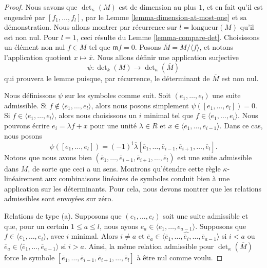 \begin{proof}
Nous savons que $\det_\kappa(M)$ est de dimension au plus $1$, et en fait qu'il
est engendré par $[f_1, \ldots, f_l]$, par le
Lemme \ref{lemma-dimension-at-most-one} et sa démonstration.
Nous allons montrer par récurrence sur $l = \text{longueur}(M)$
qu'il est non nul. Pour $l = 1$, ceci résulte du Lemme \ref{lemma-compare-det}.
Choisissons un élément non nul $f \in M$
tel que $\mathfrak m f = 0$. Posons $\overline{M} = M /\langle f \rangle$,
et notons l'application quotient $x \mapsto \overline{x}$.
Nous allons définir une application surjective
$$
\psi : \det\nolimits_k(M) \to \det\nolimits_\kappa(\overline{M})
$$
qui prouvera le lemme puisque, par récurrence, le déterminant de
$\overline{M}$ est non nul.

\medskip\noindent
Nous définissons $\psi$ sur les symboles comme suit.
Soit $(e_1, \ldots, e_l)$ une suite admissible.
Si $f \not \in \langle e_1, \ldots, e_l \rangle$, alors
nous posons simplement $\psi([e_1, \ldots, e_l]) = 0$.
Si $f \in \langle e_1, \ldots, e_l \rangle$, alors nous choisissons
un $i$ minimal tel que $f \in \langle e_1, \ldots, e_i \rangle$.
Nous pouvons écrire $e_i = \lambda f + x$ pour une unité $\lambda \in R$
et $x \in \langle e_1, \ldots, e_{i - 1} \rangle$.
Dans ce cas, nous posons
$$
\psi([e_1, \ldots, e_l]) =
(-1)^i
\overline{\lambda}[\overline{e}_1, \ldots,
\overline{e}_{i - 1},
\overline{e}_{i + 1}, \ldots, \overline{e}_l].
$$
Notons que nous avons bien
$(\overline{e}_1, \ldots,
\overline{e}_{i - 1},
\overline{e}_{i + 1}, \ldots, \overline{e}_l)$
est une suite admissible dans $\overline{M}$, de sorte que ceci a un sens.
Montrons qu'étendre cette règle $\kappa$-linéairement aux
combinaisons linéaires de symboles conduit bien à une application sur les
déterminants. Pour cela, nous devons montrer que les relations
admissibles sont envoyées sur zéro.

\medskip\noindent
Relations de type (a). Supposons que $(e_1, \ldots, e_l)$ soit une
suite admissible et que, pour un certain $1 \leq a \leq l$, nous ayons
$e_a \in \langle e_1, \ldots, e_{a - 1}\rangle$.
Supposons que $f \in \langle e_1, \ldots, e_i\rangle$, avec $i$ minimal.
Alors $i \not = a$ et
$\overline{e}_a \in \langle \overline{e}_1, \ldots,
\hat{\overline{e}_i}, \ldots, \overline{e}_{a - 1}\rangle$ si $i < a$
ou
$\overline{e}_a \in \langle \overline{e}_1, \ldots,
\overline{e}_{a - 1}\rangle$ si $i > a$.
Ainsi, la même relation admissible pour $\det_\kappa(\overline{M})$ force
le symbole $[\overline{e}_1, \ldots,
\overline{e}_{i - 1},
\overline{e}_{i + 1}, \ldots, \overline{e}_l]$
à être nul comme voulu.


\end{proof}
